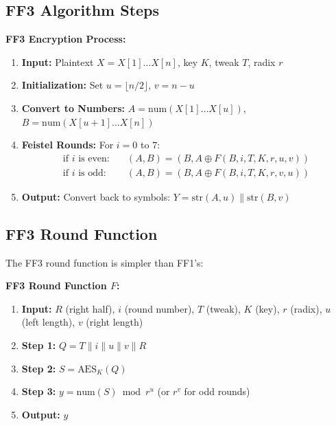 \documentclass[11pt,a4paper]{article}
\begin{document}
\subsection{FF3 Algorithm Steps}

\begin{mathbox}
\textbf{FF3 Encryption Process:}
\begin{enumerate}
    \item \textbf{Input:} Plaintext $X = X[1] \ldots X[n]$, key $K$, tweak $T$, radix $r$
    \item \textbf{Initialization:} Set $u = \lfloor n/2 \rfloor$, $v = n - u$
    \item \textbf{Convert to Numbers:} $A = \text{num}(X[1] \ldots X[u])$, $B = \text{num}(X[u+1] \ldots X[n])$
    \item \textbf{Feistel Rounds:} For $i = 0$ to $7$:
    \begin{align*}
        \text{if } i \text{ is even:} &\quad (A, B) = (B, A \oplus F(B, i, T, K, r, u, v)) \\
        \text{if } i \text{ is odd:} &\quad (A, B) = (B, A \oplus F(B, i, T, K, r, v, u))
    \end{align*}
    \item \textbf{Output:} Convert back to symbols: $Y = \text{str}(A, u) \parallel \text{str}(B, v)$
\end{enumerate}
\end{mathbox}

\subsection{FF3 Round Function}

The FF3 round function is simpler than FF1's:

\begin{mathbox}
\textbf{FF3 Round Function $F$:}
\begin{enumerate}
    \item \textbf{Input:} $R$ (right half), $i$ (round number), $T$ (tweak), $K$ (key), $r$ (radix), $u$ (left length), $v$ (right length)
    \item \textbf{Step 1:} $Q = T \parallel i \parallel u \parallel v \parallel R$
    \item \textbf{Step 2:} $S = \text{AES}_K(Q)$
    \item \textbf{Step 3:} $y = \text{num}(S) \bmod r^u$ (or $r^v$ for odd rounds)
    \item \textbf{Output:} $y$
\end{enumerate}
\end{mathbox}
\end{document}
